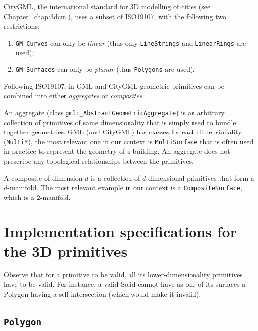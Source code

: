 %

CityGML, the international standard for 3D modelling of cities (see Chapter~\ref{chap:3dcm}), uses a subset of ISO19107, with the following two restrictions: 
\begin{enumerate}
  \item \texttt{GM\_Curves} can only be \emph{linear} (thus only \texttt{LineStrings} and \texttt{Li\-near\-Rings} are used); 
  \item \texttt{GM\_Surfaces} can only be \emph{planar} (thus \texttt{Polygons} are used).
\end{enumerate}

%

Following ISO19107, in GML and CityGML geometric primitives can be combined into either \emph{aggregates} or \emph{composites}.

An aggregate (class \texttt{gml:\_AbstractGeometricAggregate}) is an arbitrary collection of primitives of same dimensionality that is simply used to bundle together geometries.
GML (and CityGML) has classes for each dimensionality (\texttt{Multi*}), the most relevant one in our context is \texttt{MultiSurface} that is often used in practice to represent the geometry of a building.
An aggregate does not prescribe any topological relationships between the primitives.

A composite of dimension $d$ is a collection of $d$-dimensional primitives that form a $d$-manifold. 
The most relevant example in our context is a \texttt{CompositeSurface}, which is a 2-manifold.



%
\section[Implementation specifications]{Implementation specifications for the 3D primitives}%
\label{sec:isovalidity}


Observe that for a primitive to be valid, all its lower-dimensionality primitives have to be valid.
For instance, a valid Solid cannot have as one of its surfaces a Polygon having a self-intersection (which would make it invalid).


\subsection{\texttt{Polygon}}

